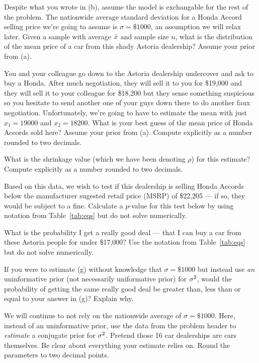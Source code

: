 \documentclass[12pt]{article}
\newcommand{\compexpl}{Compute explicitly as a number rounded to two decimals.}
\begin{document}
 Despite what you wrote in (b), assume the model is exchangable for the rest of the problem. The nationwide average standard deviation for a Honda Accord selling price we're going to assume is $\sigma = \$1000$, an assumption we will relax later. Given a sample with average $\bar{x}$ and sample size $n$, what is the distribution of the mean price of a car from this shady Astoria dealership? Assume your prior from (a).

 You and your colleague go down to the Astoria dealership undercover and ask to buy a Honda. After much negotiation, they will sell it to you for \$19,000 and they will sell it to your colleague for \$18,200 but they sense something suspicious so you hesitate to send another one of your guys down there to do another faux negotiation. Unfortunately, we're going to have to estimate the mean with just $x_1=19000$ and $x_2 = 18200$. What is your best guess of the mean price of Honda Accords sold here? Assume your prior from (a). \compexpl {}

 What is the shrinkage value (which we have been denoting $\rho$) for this estimate? \compexpl{}

 Based on this data, we wish to test if this dealership is selling Honda Accords below the manufacturer sugested retail price (MSRP) of \$22,205 --- if so, they would be subject to a fine. Calculate a $p$-value for this test below by using notation from Table~\ref{tab:eqs} but do not solve numerically.

 What is the probability I get a really good deal --- that I can buy a car from these Astoria people for under \$17,000? Use the notation from Table~\ref{tab:eqs} but do not solve numerically.


 If you were to estimate (g) without knowledge that $\sigma = \$1000$ but instead use \textit{an} uninformative prior (not necessarily  uniformative prior) for $\sigma^2$, would the probability of getting the same really good deal be greater than, less than or equal to your answer in (g)? Explain why. 


 We will continue to not rely on the nationwide average of $\sigma = \$1000$. Here, instead of an uninformative prior, use the data from the problem header to \textit{estimate} a conjugate prior for $\sigma^2$. Pretend those 16 car dealerships are cars themselves. Be clear about everything your estimate relies on. Round the parameters to two decimal points.
\end{document}
